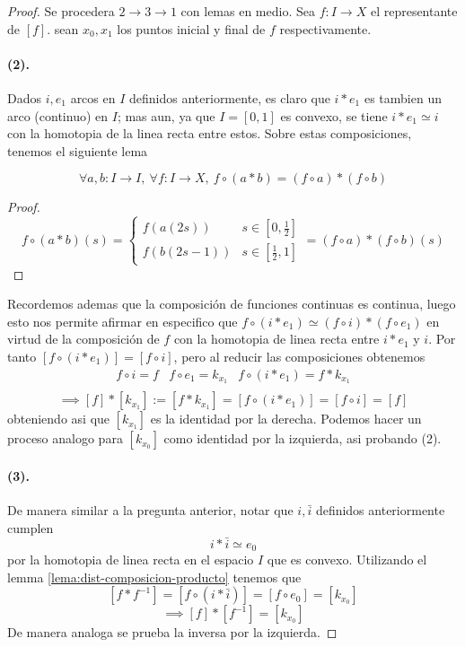 \begin{proof}
Se procedera \(2 \to 3 \to 1\) con lemas en medio. Sea \(f : I \to X\) el
representante de \([f]\). sean \(x_0, x_1\) los puntos inicial y final de
\(f\) respectivamente.

\paragraph{(2).} Dados \(i,e_1\) arcos en \(I\) definidos anteriormente,
es claro que \(i * e_1\) es tambien un arco (continuo) en \(I\); mas aun,
ya que \(I = [0,1]\) es convexo, se tiene \(i * e_1 \simeq i\) con la
homotopia de la linea recta entre estos. Sobre estas composiciones,
tenemos el siguiente lema
\begin{lema}
\label{lema:dist-composicion-producto}
\[\forall a,b : I \to I,\ \forall f : I \to X,\ f \circ (a * b) = (f
\circ a) * (f \circ b) \]
\end{lema}
\begin{proof}
  \[ f \circ (a*b) (s) =
    \begin{cases}
      f (a(2s)) & s \in [0,\frac{1}{2}] \\
      f (b(2s - 1)) & s \in [\frac{1}{2} , 1]
    \end{cases}
    = (f \circ a) * (f \circ b) (s)
  \]
\end{proof}
\noindent Recordemos ademas que la composición de funciones continuas es
continua, luego esto nos permite afirmar en especifico que \( f \circ (i
* e_1) \simeq (f \circ i) * (f \circ e_1) \) en virtud de la composición
de \(f\) con la homotopia de linea recta entre \(i * e_1 \) y \(i\). Por
tanto \( [f \circ (i * e_1)] = [f \circ i] \), pero al reducir las
composiciones obtenemos
\[
  \begin{matrix}
    f \circ i = f & f \circ e_1 = k_{x_1} & f \circ (i * e_1) = f *
    k_{x_{1}} \\
  \end{matrix}
\]
\[ \implies [f] * [k_{x_1}] := [f * k_{x_1}] = [f \circ (i * e_1)] = [ f
\circ i ] = [f] \]
obteniendo asi que \([k_{x_1}]\) es la identidad por la derecha. Podemos
hacer un proceso analogo para \([k_{x_0}]\) como identidad por la
izquierda, asi probando (2).

\paragraph{(3).} De manera similar a la pregunta anterior, notar que \(i,
\bar{i}\) definidos anteriormente cumplen
\[ i * \bar{i} \simeq e_0 \]
por la homotopia de linea recta en el espacio \(I\) que es convexo.
Utilizando el lemma \eqref{lema:dist-composicion-producto} tenemos que
\[ [f * f^{-1}] = [f \circ (i * \bar{i})] = [f \circ e_0] = [k_{x_0}] \]
\[ \implies [f] * [f^{-1}] = [k_{x_0}] \]
De manera analoga se prueba la inversa por la izquierda.


\end{proof}
